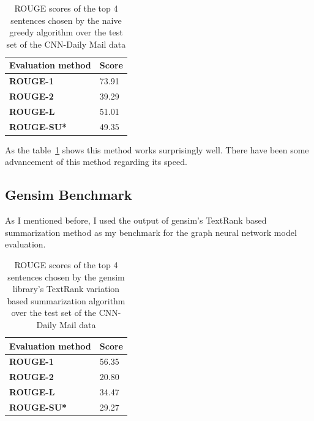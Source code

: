 \begin{table}[!ht]
	\centering
	\begin{tabular}{| l | l |}
		\hline
		\textbf{Evaluation method}&\textbf{Score}\\ \hline \hline
		\textbf{ROUGE-1}&73.91\\ \hline
		\textbf{ROUGE-2}&39.29 \\ \hline
		\textbf{ROUGE-L}&51.01 \\ \hline
		\textbf{ROUGE-SU*}&49.35 \\ \hline
	\end{tabular}
	\caption{ROUGE scores of the top 4 sentences chosen by the naive greedy algorithm over the test set of the CNN-Daily Mail data}
	\label{tab:extr}
\end{table}
As the table~\ref{tab:extr} shows this method works surprisingly well. There have been some advancement of this method regarding its speed\cite{GreedySum}.

\subsection{Gensim Benchmark}
As I mentioned before, I used the output of gensim's TextRank based summarization method as my benchmark for the graph neural network model evaluation.
\begin{table}[!ht]
	\centering
	\begin{tabular}{| l | l |}
		\hline
		\textbf{Evaluation method}&\textbf{Score}\\ \hline \hline
		\textbf{ROUGE-1}&56.35 \\ \hline
		\textbf{ROUGE-2}&20.80 \\ \hline
		\textbf{ROUGE-L}&34.47 \\ \hline
		\textbf{ROUGE-SU*}&29.27 \\ \hline
	\end{tabular}
	\caption{ROUGE scores of the top 4 sentences chosen by the gensim library's TextRank variation based summarization algorithm over the test set of the CNN-Daily Mail data}
\end{table}
\FloatBarrier

